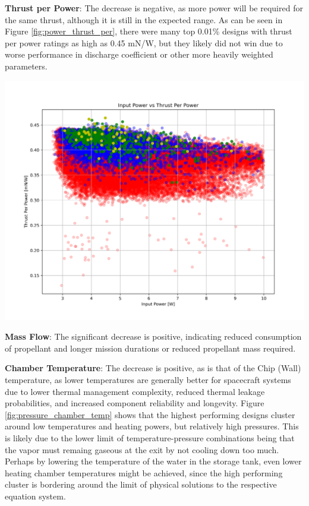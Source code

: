 \documentclass{homework}
\begin{document}
\begin{multicols}{2}
\textbf{Thrust per Power}: The decrease is negative, as more power will be required for the same thrust, although it is still in the expected range. As can be seen in Figure \ref{fig:power_thrust_per}, there were many top 0.01\% designs with thrust per power ratings as high as 0.45 mN/W, but they likely did not win due to worse performance in discharge coefficient or other more heavily weighted parameters.

\begin{minipage}{\linewidth}
      \centering
      \includegraphics[width=\linewidth]{images/input_power_thrust_per_power.png}
      \label{fig:power_thrust_per}
  \end{minipage}

\textbf{Mass Flow}: The significant decrease is positive, indicating reduced consumption of propellant and longer mission durations or reduced propellant mass required.

\textbf{Chamber Temperature}: The decrease is positive, as is that of the Chip (Wall) temperature, as lower temperatures are generally better for spacecraft systems due to lower thermal management complexity, reduced thermal leakage probabilities, and increased component reliability and longevity. Figure \ref{fig:pressure_chamber_temp} shows that the highest performing designs cluster around low temperatures and heating powers, but relatively high pressures. This is likely due to the lower limit of temperature-pressure combinations being that the vapor must remaing gaseous at the exit by not cooling down too much. Perhaps by lowering the temperature of the water in the storage tank, even lower heating chamber temperatures might be achieved, since the high performing cluster is bordering around the limit of physical solutions to the respective equation system.


\end{multicols}
\end{document}
